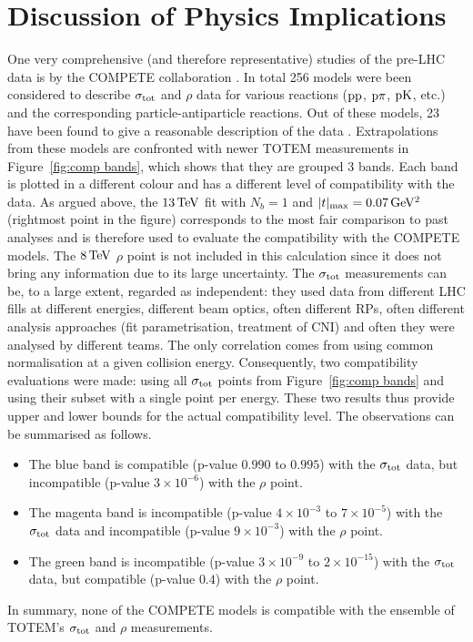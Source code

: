 \section{Discussion of Physics Implications}
\label{sec:discussion}

One very comprehensive (and therefore representative) studies of the pre-LHC data is by the COMPETE collaboration \cite{compete}. In total 256 models were been considered to describe $\sigma_{\rm tot}$ and $\rho$ data for various reactions ($\rm pp$, $\rm p\pi$, $\rm pK$, etc.) and the corresponding particle-antiparticle reactions. Out of these models, 23 have been found to give a reasonable description of the data \cite{compete-details}. Extrapolations from these models are confronted with newer TOTEM measurements in Figure~\ref{fig:comp bands}, which shows that they are grouped 3 bands. Each band is plotted in a different colour and has a different level of compatibility with the data. As argued above, the $13\,{\rm TeV}$ fit with $N_b=1$ and $|t|_{\rm max} = 0.07\,{\rm GeV^2}$ (rightmost point in the figure) corresponds to the most fair comparison to past analyses and is therefore used to evaluate the compatibility with the COMPETE models. The $8\,{\rm TeV}$ $\rho$ point is not included in this calculation since it does not bring any information due to its large uncertainty. The $\sigma_{\rm tot}$ measurements can be, to a large extent, regarded as independent: they used data from different LHC fills at different energies, different beam optics, often different RPs, often different analysis approaches (fit parametrisation, treatment of CNI) and often they were analysed by different teams. The only correlation comes from using common normalisation at a given collision energy. Consequently, two compatibility evaluations were made: using all $\sigma_{\rm tot}$ points from Figure~\ref{fig:comp bands} and using their subset with a single point per energy. These two results thus provide upper and lower bounds for the actual compatibility level. The observations can be summarised as follows.
\begin{itemize}[noitemsep,topsep=0pt]
\item The blue band is compatible (p-value $0.990$ to $0.995$) with the $\sigma_{\rm tot}$ data, but incompatible (p-value $3\times10^{-6}$) with the $\rho$ point.
\item The magenta band is incompatible (p-value $4\times10^{-3}$ to $7\times10^{-5}$) with the $\sigma_{\rm tot}$ data and incompatible (p-value $9\times10^{-3}$) with the $\rho$ point.
\item The green band is incompatible (p-value $3\times10^{-9}$ to $2\times10^{-15}$) with the $\sigma_{\rm tot}$ data, but compatible (p-value $0.4$) with the $\rho$ point.
\end{itemize}
In summary, none of the COMPETE models is compatible with the ensemble of TOTEM's $\sigma_{\rm tot}$ and $\rho$ measurements.

